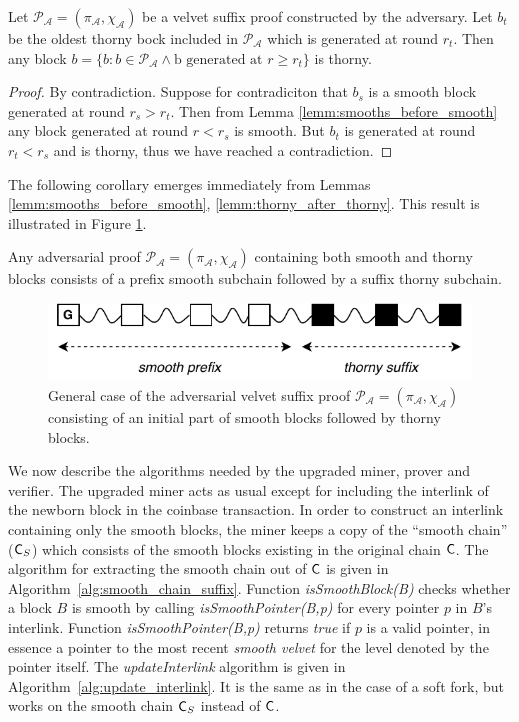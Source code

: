 \begin{lemma}
	Let $\mathcal{P_A} = (\pi_\mathcal{A}, \chi_\mathcal{A})$ be a velvet suffix proof constructed by the adversary. Let $b_t$ be the oldest thorny bock included in $\mathcal{P_A}$ which is generated at round $r_t$. Then any block $b = \{b: b \in \mathcal{P_A} \wedge \text{b generated at }r \geq r_t \}$ is thorny.
	\label{lemm:thorny_after_thorny}
\end{lemma}
\begin{proof}
By contradiction. Suppose for contradiciton that $b_s$ is a smooth block generated at round $r_s > r_t$. Then from Lemma \ref{lemm:smooths_before_smooth} any block generated at round $r < r_s$ is smooth. But $b_t$ is generated at round $r_t < r_s$ and is thorny, thus we have reached a contradiction.
\end{proof}

The following corollary emerges immediately from Lemmas \ref{lemm:smooths_before_smooth}, \ref{lemm:thorny_after_thorny}. This result is illustrated in Figure \ref{fig:adversarial_velvet_proof}.

\begin{corollary}
	Any adversarial proof $\mathcal{P_A} = (\pi_\mathcal{A}, \chi_\mathcal{A})$ containing both smooth and thorny blocks consists of a prefix smooth subchain followed by a suffix thorny subchain.
	\label{cor:adversarial_proof_scheme}
\end{corollary}

\begin{figure}[h!]
	\begin{center}
		\includegraphics[width=0.7\columnwidth]{figures/adversarial_velvet_proof.pdf}
	\end{center}
	\caption{General case of the adversarial velvet suffix proof $\mathcal{P_A} = (\pi_\mathcal{A}, \chi_\mathcal{A})$ consisting of an initial part of smooth blocks followed by thorny blocks.}
	\label{fig:adversarial_velvet_proof}
\end{figure}
We now describe the algorithms needed by the upgraded miner, prover and verifier. The upgraded miner acts as usual except for including the interlink of the newborn block in the coinbase transaction. In order to construct an interlink containing only the smooth blocks, the miner keeps a copy of the ``smooth chain'' ($\mathsf{C}_S$) which consists of the smooth blocks existing in the original chain $\mathsf{C}$. The algorithm for extracting the smooth chain out of $\mathsf{C}$ is given in Algorithm~\ref{alg:smooth_chain_suffix}. Function \textit{isSmoothBlock(B)} checks whether a block $B$ is smooth by calling \textit{isSmoothPointer(B,p)} for every pointer $p$ in $B$'s interlink. Function \textit{isSmoothPointer(B,p)} returns \emph{true} if $p$ is a valid pointer, in essence a pointer to the most recent \emph{smooth velvet} for the level denoted by the pointer itself. The \textit{updateInterlink} algorithm is given in Algorithm~\ref{alg:update_interlink}. It is the same as in the case of a soft fork, but works on the smooth chain $\mathsf{C}_S$ instead of $\mathsf{C}$.

